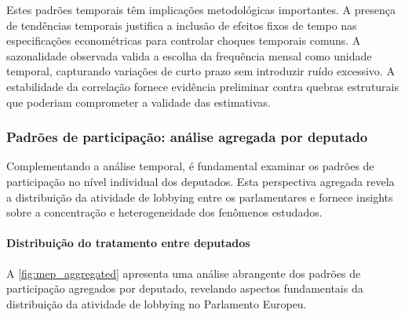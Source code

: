 Estes padrões temporais têm implicações metodológicas importantes. A presença de tendências temporais justifica a inclusão de efeitos fixos de tempo nas especificações econométricas para controlar choques temporais comuns. A sazonalidade observada valida a escolha da frequência mensal como unidade temporal, capturando variações de curto prazo sem introduzir ruído excessivo. A estabilidade da correlação fornece evidência preliminar contra quebras estruturais que poderiam comprometer a validade das estimativas.

\subsubsection{Padrões de participação: análise agregada por deputado}

Complementando a análise temporal, é fundamental examinar os padrões de participação no nível individual dos deputados. Esta perspectiva agregada revela a distribuição da atividade de lobbying entre os parlamentares e fornece insights sobre a concentração e heterogeneidade dos fenômenos estudados.

\paragraph{Distribuição do tratamento entre deputados}

A \autoref{fig:mep_aggregated} apresenta uma análise abrangente dos padrões de participação agregados por deputado, revelando aspectos fundamentais da distribuição da atividade de lobbying no Parlamento Europeu.

